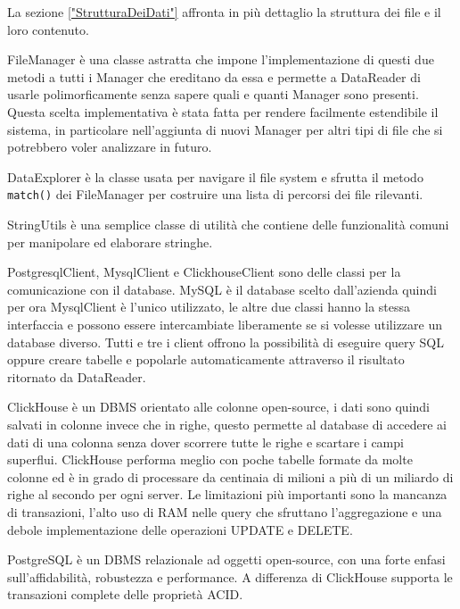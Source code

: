 La sezione \ref{"StrutturaDeiDati"} affronta in più dettaglio la struttura dei file e il loro contenuto.

FileManager è una classe astratta che impone l'implementazione di questi due metodi a tutti i Manager che ereditano da essa e permette a DataReader di usarle polimorficamente senza sapere quali e quanti Manager sono presenti. Questa scelta implementativa è stata fatta per rendere facilmente estendibile il sistema, in particolare nell'aggiunta di nuovi Manager per altri tipi di file che si potrebbero voler analizzare in futuro.

DataExplorer è la classe usata per navigare il file system e sfrutta il metodo \texttt{match()} dei FileManager per costruire una lista di percorsi dei file rilevanti.

StringUtils è una semplice classe di utilità che contiene delle funzionalità comuni per manipolare ed elaborare stringhe.

PostgresqlClient, MysqlClient e ClickhouseClient sono delle classi per la comunicazione con il database. MySQL\cite{mysql} è il database scelto dall'azienda quindi per ora MysqlClient è l'unico utilizzato, le altre due classi hanno la stessa interfaccia e possono essere intercambiate liberamente se si volesse utilizzare un database diverso.
Tutti e tre i client offrono la possibilità di eseguire query SQL oppure creare tabelle e popolarle automaticamente attraverso il risultato ritornato da DataReader.

ClickHouse\cite{clickhouse} è un DBMS orientato alle colonne open-source, i dati sono quindi salvati in colonne invece che in righe, questo permette al database di accedere ai dati di una colonna senza dover scorrere tutte le righe e scartare i campi superflui. ClickHouse performa meglio con poche tabelle formate da molte colonne ed è in grado di processare da centinaia di milioni a più di un miliardo di righe al secondo per ogni server. Le limitazioni più importanti sono la mancanza di transazioni, l'alto uso di RAM nelle query che sfruttano l'aggregazione e una debole implementazione delle operazioni UPDATE e DELETE.

PostgreSQL\cite{postgresql} è un DBMS relazionale ad oggetti open-source, con una forte enfasi sull'affidabilità, robustezza e performance. A differenza di ClickHouse supporta le transazioni complete delle proprietà ACID.

